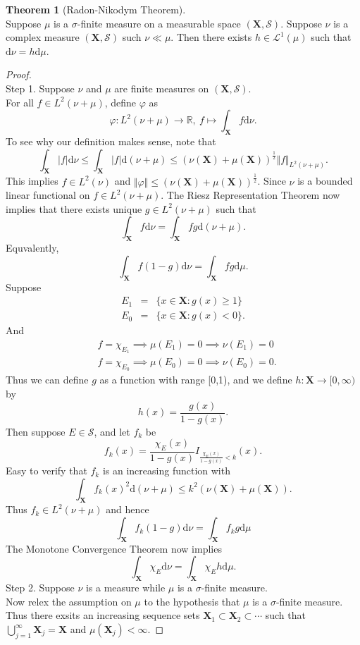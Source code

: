 \documentclass[12pt]{book}
\theoremstyle{definition}
\newtheorem{theorem}{Theorem}[chapter]
\newcommand{\R}{\mathbb{R}}
\newcommand{\X}{\mathbf{X}}
\newcommand{\D}{\mathrm{d}}
\newcommand{\LL}{\mathcal{L}}
\newcommand{\Union}[2]{{\bigcup_{#1}^{#2}}}
\begin{document}
\begin{theorem}[Radon-Nikodym Theorem] \ \\
Suppose $\mu$ is a $\sigma$-finite measure on a measurable space $(\X,\mathcal S)$. Suppose $\nu$ is a complex measure $(\X,\mathcal S)$ such $\nu \ll \mu$. Then there exists $h \in \LL^1(\mu)$ such that $\D \nu = h\D \mu$.
\end{theorem}
\begin{proof} \ \\
Step 1. Suppose $\nu$ and $\mu$ are finite measures on $(\X,\mathcal S)$. \\
For all $f \in L^2(\nu+\mu)$, define $\varphi$ as 
$$
\varphi : L^2(\nu+\mu) \to \R, \ f \mapsto \int_\X f \D \nu.
$$ 
To see why our definition makes sense, note that 
$$
\int_\X |f| \D \nu \leq \int_\X |f| \D (\nu+\mu) \leq (\nu(\X)+\mu(\X))^{\frac{1}{2}}\Vert f\Vert_{L^2(\nu+\mu)}.
$$
This implies $f\in L^2(\nu)$ and $\Vert \varphi \Vert \leq (\nu(\X)+\mu(\X))^{\frac{1}{2}}$.
Since $\nu$ is a bounded linear functional on $f \in L^2(\nu+\mu)$. The Riesz Representation Theorem now implies that there exists unique $g \in L^2(\nu+\mu)$ such that 
$$
\int_\X f \D \nu = \int_\X fg \D (\nu+\mu).
$$
Equvalently,
$$
\int_\X f(1-g) \D \nu = \int_\X fg \D \mu.
$$
Suppose 
\begin{eqnarray*}
	E_1 &=& \{ x\in \X: g(x) \geq 1   \}\\
    E_0 &=& \{ x\in \X: g(x) < 0   \}.
\end{eqnarray*}
And 
\begin{eqnarray*}
	&f=\chi_{E_1} \implies \mu(E_1) = 0 \implies \nu(E_1)=0 \\
	&f= \chi_{E_0} \implies \mu(E_0) = 0 \implies \nu(E_0)=0.
\end{eqnarray*}
Thus we can define $g$ as a function with range [0,1), and we define $h:\X \to [0,\infty)$ by
$$
h(x) = \frac{g(x)}{1-g(x)}.
$$
Then suppose $E\in\mathcal S$, and let $f_k$ be
$$
f_k(x) = \frac{\chi_E(x)}{1-g(x)}I_{\frac{\chi_E(x)}{1-g(x)}<k}(x).
$$
Easy to verify that $f_k$ is an increasing function with
$$
\int_\X f_k(x)^2 \D (\nu+\mu) \leq k^2 (\nu(\X)+\mu(\X)).
$$
Thus $f_k \in L^2(\nu+\mu)$ and hence 
$$
\int_\X f_k(1-g) \D \nu = \int_\X f_kg\D \mu
$$
The Monotone Convergence Theorem now implies 
$$
\int_\X \chi_E \D \nu = \int_\X \chi_E h \D \mu.
$$
Step 2. Suppose $\nu$ is a measure while $\mu$ is a $\sigma$-finite measure. \\
Now relex the assumption on $\mu$ to the hypothesis that $\mu$ is a $\sigma$-finite measure.
Thus there exsits an increasing sequence sets $\X_1\subset\X_2 \subset \cdots$ such that $\Union{j=1}{\infty}\X_j=\X$ and $\mu(\X_j)<\infty$.

\end{proof}
\end{document}

